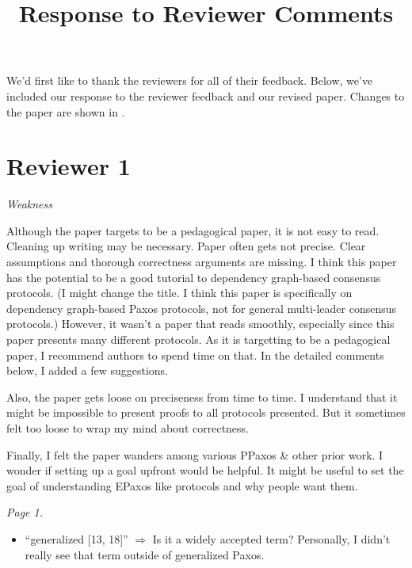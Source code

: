 \documentclass[letterpaper,twocolumn,10pt]{article}
\newenvironment{reviewerquote}
{\list{}{\leftmargin=\parindent\rightmargin=0in}\item[] \itshape \color{ReviewerDarkGray}}%
{\endlist}
\begin{document}
\title{Response to Reviewer Comments}

\maketitle

\thispagestyle{empty}

We'd first like to thank the reviewers for all of their feedback. Below, we've
included our response to the reviewer feedback and our revised paper. Changes
to the paper are shown in .

\section*{Reviewer 1}
\begin{reviewerquote}
  Weakness

  Although the paper targets to be a pedagogical paper, it is not easy to read.
  Cleaning up writing may be necessary.  Paper often gets not precise. Clear
  assumptions and thorough correctness arguments are missing.  I think this
  paper has the potential to be a good tutorial to dependency graph-based
  consensus protocols. (I might change the title. I think this paper is
  specifically on dependency graph-based Paxos protocols, not for general
  multi-leader consensus protocols.) However, it wasn't a paper that reads
  smoothly, especially since this paper presents many different protocols. As
  it is targetting to be a pedagogical paper, I recommend authors to spend time
  on that. In the detailed comments below, I added a few suggestions.

  Also, the paper gets loose on preciseness from time to time. I understand
  that it might be impossible to present proofs to all protocols presented. But
  it sometimes felt too loose to wrap my mind about correctness.

  Finally, I felt the paper wanders among various PPaxos \& other prior work. I
  wonder if setting up a goal upfront would be helpful. It might be useful to
  set the goal of understanding EPaxos like protocols and why people want them.
\end{reviewerquote}

\begin{reviewerquote}
  Page 1.

  \begin{itemize}
    \item
      ``generalized [13, 18]'' $\Rightarrow$ Is it a widely accepted term?
      Personally, I didn't really see that term outside of generalized Paxos.
  \end{itemize}
\end{reviewerquote}
\end{document}
